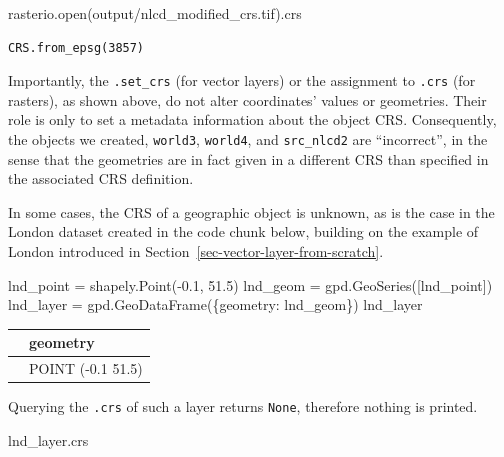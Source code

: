 \documentclass[
  letterpaper,
]{krantz}
\newenvironment{Shaded}{\begin{snugshade}}{\end{snugshade}}
\newcommand{\BuiltInTok}[1]{\textcolor[rgb]{0.00,0.23,0.31}{#1}}
\newcommand{\FloatTok}[1]{\textcolor[rgb]{0.68,0.00,0.00}{#1}}
\newcommand{\NormalTok}[1]{\textcolor[rgb]{0.00,0.23,0.31}{#1}}
\newcommand{\OperatorTok}[1]{\textcolor[rgb]{0.37,0.37,0.37}{#1}}
\newcommand{\StringTok}[1]{\textcolor[rgb]{0.13,0.47,0.30}{#1}}
\begin{document}
\begin{Shaded}
\begin{Highlighting}[]
\NormalTok{rasterio.}\BuiltInTok{open}\NormalTok{(}\StringTok{\textquotesingle{}output/nlcd\_modified\_crs.tif\textquotesingle{}}\NormalTok{).crs}
\end{Highlighting}
\end{Shaded}

\begin{verbatim}
CRS.from_epsg(3857)
\end{verbatim}

Importantly, the \texttt{.set\_crs} (for vector layers) or the
assignment to \texttt{.crs} (for rasters), as shown above, do not alter
coordinates' values or geometries. Their role is only to set a metadata
information about the object CRS. Consequently, the objects we created,
\texttt{world3}, \texttt{world4}, and \texttt{src\_nlcd2} are
``incorrect'', in the sense that the geometries are in fact given in a
different CRS than specified in the associated CRS definition.

In some cases, the CRS of a geographic object is unknown, as is the case
in the London dataset created in the code chunk below, building on the
example of London introduced in
Section~\ref{sec-vector-layer-from-scratch}.

\begin{Shaded}
\begin{Highlighting}[]
\NormalTok{lnd\_point }\OperatorTok{=}\NormalTok{ shapely.Point(}\OperatorTok{{-}}\FloatTok{0.1}\NormalTok{, }\FloatTok{51.5}\NormalTok{)}
\NormalTok{lnd\_geom }\OperatorTok{=}\NormalTok{ gpd.GeoSeries([lnd\_point])}
\NormalTok{lnd\_layer }\OperatorTok{=}\NormalTok{ gpd.GeoDataFrame(\{}\StringTok{\textquotesingle{}geometry\textquotesingle{}}\NormalTok{: lnd\_geom\})}
\NormalTok{lnd\_layer}
\end{Highlighting}
\end{Shaded}

\begin{longtable}[]{@{}ll@{}}
\toprule\noalign{}
& geometry \\
\midrule\noalign{}
\endhead
\bottomrule\noalign{}
\endlastfoot
0 & POINT (-0.1 51.5) \\
\end{longtable}

Querying the \texttt{.crs} of such a layer returns \texttt{None},
therefore nothing is printed.

\begin{Shaded}
\begin{Highlighting}[]
\NormalTok{lnd\_layer.crs}
\end{Highlighting}
\end{Shaded}
\end{document}
